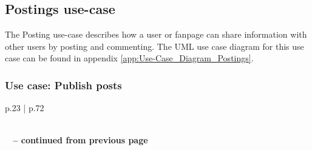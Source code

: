 \documentclass[11pt,a4paper]{report}
\begin{document}
\subsection{Postings use-case}
The Posting use-case describes how a user or fanpage can share information with other users by posting and commenting. The UML use case diagram for this use case can be found in appendix \vref{app:Use-Case_Diagram_Postings}.

\subsubsection{Use case: Publish posts}

\begin{longtable}{p{} | p{}}
    \caption{Use case: Publish posts} \label{tab:ucPubPosts} \\
    \endfirsthead
        {{\bfseries \tablename\ \thetable{} -- continued from previous page}} \\
         \\
    \endhead
         \\ 
    \endfoot
    \endlastfoot
    

\end{longtable}
\end{document}
